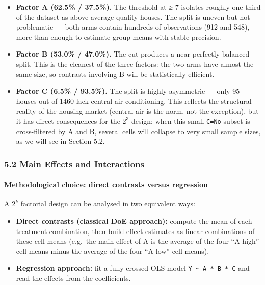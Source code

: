 \begin{itemize}
\tightlist
\item
  \textbf{Factor A (62.5\% / 37.5\%).} The threshold at ≥ 7 isolates
  roughly one third of the dataset as above-average-quality houses. The
  split is uneven but not problematic --- both arms contain hundreds of
  observations (912 and 548), more than enough to estimate group means
  with stable precision.
\item
  \textbf{Factor B (53.0\% / 47.0\%).} The cut produces a near-perfectly
  balanced split. This is the cleanest of the three factors: the two
  arms have almost the same size, so contrasts involving B will be
  statistically efficient.
\item
  \textbf{Factor C (6.5\% / 93.5\%).} The split is highly asymmetric ---
  only 95 houses out of 1460 lack central air conditioning. This
  reflects the structural reality of the housing market (central air is
  the norm, not the exception), but it has direct consequences for the
  \(2^3\) design: when this small \texttt{C=No} subset is cross-filtered
  by A and B, several cells will collapse to very small sample sizes, as
  we will see in Section 5.2.
\end{itemize}

\subsubsection{5.2 Main Effects and
Interactions}\label{main-effects-and-interactions}

\paragraph{Methodological choice: direct contrasts versus
regression}\label{methodological-choice-direct-contrasts-versus-regression}

A \(2^k\) factorial design can be analysed in two equivalent ways:

\begin{itemize}
\tightlist
\item
  \textbf{Direct contrasts (classical DoE approach):} compute the mean
  of each treatment combination, then build effect estimates as linear
  combinations of these cell means (e.g.~the main effect of A is the
  average of the four ``A high'' cell means minus the average of the
  four ``A low'' cell means).
\item
  \textbf{Regression approach:} fit a fully crossed OLS model
  \texttt{Y\ \textasciitilde{}\ A\ *\ B\ *\ C} and read the effects from
  the coefficients.
\end{itemize}


